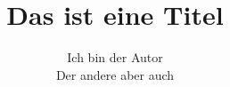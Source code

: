 \documentclass[ngerman,%
cd=true,cd=pale,
cdgeometry=false,
cdfont=ultrabold,
headings=heavy,
]{tudscrreprt}
\begin{document}
\title{Das ist eine Titel}
\author{Ich bin der Autor \\ Der andere aber auch}
\maketitle

\meaning\\
\end{document}
